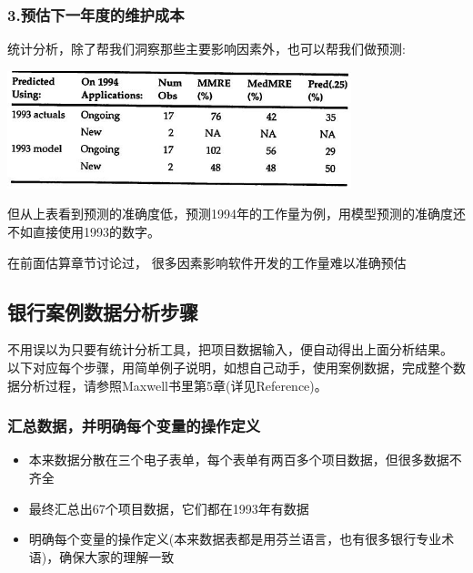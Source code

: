 \hypertarget{ux9884ux4f30ux4e0bux4e00ux5e74ux5ea6ux7684ux7ef4ux62a4ux6210ux672c}{%
\subsubsection{3.预估下一年度的维护成本}\label{ux9884ux4f30ux4e0bux4e00ux5e74ux5ea6ux7684ux7ef4ux62a4ux6210ux672c}}

统计分析，除了帮我们洞察那些主要影响因素外，也可以帮我们做预测:


\includegraphics[width=10cm]{maxwell_t55.jpg}

但从上表看到预测的准确度低，预测1994年的工作量为例，用模型预测的准确度还不如直接使用1993的数字。

在前面估算章节讨论过， 很多因素影响软件开发的工作量难以准确预估

\hypertarget{ux6570ux636eux5206ux6790ux6b65ux9aa4}{%
\subsection{银行案例数据分析步骤}\label{ux6570ux636eux5206ux6790ux6b65ux9aa4}}

不用误以为只要有统计分析工具，把项目数据输入，便自动得出上面分析结果。
以下对应每个步骤，用简单例子说明，如想自己动手，使用案例数据，完成整个数据分析过程，请参照Maxwell书里第5章(详见Reference)。

\hypertarget{ux6c47ux603bux6570ux636eux5e76ux660eux786eux6bcfux4e2aux53d8ux91cfux7684ux64cdux4f5cux5b9aux4e49}{%
\subsubsection{汇总数据，并明确每个变量的操作定义}\label{ux6c47ux603bux6570ux636eux5e76ux660eux786eux6bcfux4e2aux53d8ux91cfux7684ux64cdux4f5cux5b9aux4e49}}

\begin{itemize}
\tightlist
\item
  本来数据分散在三个电子表单，每个表单有两百多个项目数据，但很多数据不齐全
\item
  最终汇总出67个项目数据，它们都在1993年有数据
\item
  明确每个变量的操作定义(本来数据表都是用芬兰语言，也有很多银行专业术语)，确保大家的理解一致
\end{itemize}

